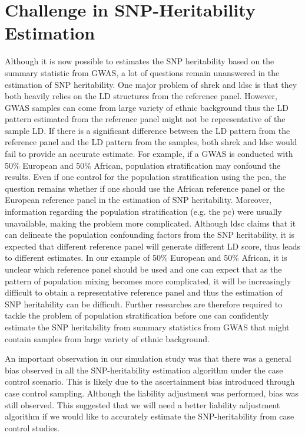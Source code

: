 \documentclass[12pt]{scrbook}
\begin{document}
	\section{Challenge in SNP-Heritability Estimation}
	Although it is now possible to estimates the \gls{SNP} heritability based on the summary statistic from \gls{GWAS}, a lot of questions remain unanswered in the estimation of \gls{SNP} heritability.
	One major problem of \gls{shrek} and \gls{ldsc} is that they both heavily relies on the \gls{LD} structures from the reference panel.
	However, \gls{GWAS} samples can come from large variety of ethnic background thus the \gls{LD} pattern estimated from the reference panel might not be representative of the sample \gls{LD}.
	If there is a significant difference between the \gls{LD} pattern from the reference panel and the \gls{LD} pattern from the samples, both \gls{shrek} and \gls{ldsc} would fail to provide an accurate estimate. 
	For example, if a \gls{GWAS} is conducted with 50\% European and 50\% African, population stratification may confound the results.
	Even if one control for the population stratification using the \gls{pca}, the question remains whether if one should use the African reference panel or the European reference panel in the estimation of \gls{SNP} heritability.
	Moreover, information regarding the population stratification (e.g. the \gls{pc}) were usually unavailable, making the problem more complicated.
	Although \gls{ldsc} claims that it can delineate the population confounding factors from the \gls{SNP} heritability, it is expected that different reference panel will generate different \gls{LD} score, thus leads to different estimates.
	In our example of 50\% European and 50\% African, it is unclear which reference panel should be used and one can expect that as the pattern of population mixing becomes more complicated, it will be increasingly difficult to obtain a representative reference panel and thus the estimation of \gls{SNP} heritability can be difficult. 
	Further researches are therefore required to tackle the problem of population stratification before one can confidently estimate the \gls{SNP} heritability from summary statistics from \gls{GWAS} that might contain samples from large variety of ethnic background.
	
	An important observation in our simulation study was that there was a general bias observed in all the \gls{SNP}-heritability estimation algorithm under the case control scenario.
	This is likely due to the ascertainment bias introduced through case control sampling.
	Although the liability adjustment was performed, bias was still observed. 
	This suggested that we will need a better liability adjustment algorithm if we would like to accurately estimate the \gls{SNP}-heritability from case control studies.
	
\end{document}
